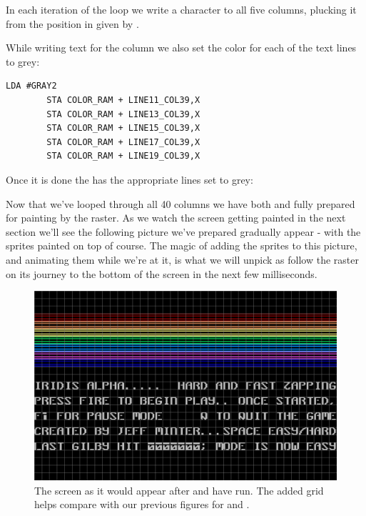 In each iteration of the loop we write a character to all five columns, plucking it from the position in
 given by . 



While writing text for the column we also set the color for each of the text lines to grey:

\begin{lstlisting}[caption=In \icode{DrawTitleScreenText}]
        LDA #GRAY2
        STA COLOR_RAM + LINE11_COL39,X
        STA COLOR_RAM + LINE13_COL39,X
        STA COLOR_RAM + LINE15_COL39,X
        STA COLOR_RAM + LINE17_COL39,X
        STA COLOR_RAM + LINE19_COL39,X
\end{lstlisting}

Once it is done the  has the appropriate lines set to grey:


Now that we've looped through all 40 columns we have both  and  fully
prepared for painting by the raster. As we watch the screen getting painted in the next section we'll see
the following picture we've prepared gradually appear - with the sprites painted on top of course. The
magic of adding the sprites to this picture, and animating them while we're at it, is what we will
unpick as follow the raster on its journey to the bottom of the screen in the next few milliseconds.

\begin{figure}[H]
    \begin{adjustbox}{width=13cm,center}
    \includegraphics[width=13cm]{titlescreen/titlescreen_textonly_grid.png}%
    \end{adjustbox}
  \caption{The screen as it would appear after  and  have run. The added
  grid helps compare with our previous figures for  and .}
\end{figure}

